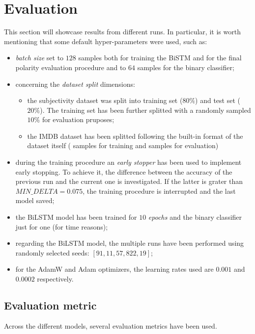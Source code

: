 
\section{Evaluation}
\label{sec:eval}
This section will showcase results from different runs. In particular, it is worth mentioning that some default hyper-parameters were used, such as:
\begin{itemize}
    \item \textit{batch size} set to $128$ samples both for training the BiSTM and for the final polarity evaluation procedure and to $64$ 
        samples for the  binary classifier;
    \item concerning the \textit{dataset split} dimensions:
        \begin{itemize}
            \item the subjectivity dataset was split into training set ($80\%$) and test set ($20\%$). The training set has been further splitted 
            with a  randomly sampled $10\%$ for evaluation pruposes;
        \item the IMDB dataset has been splitted following the built-in format of the dataset itself ( samples for training
            and  samples for evaluation)
        \end{itemize}
    \item during the training procedure an \textit{early stopper} has been used to implement early stopping. To achieve it, the 
        difference between the accuracy of the previous run and the current one is investigated. If the latter is grater than $MIN\_DELTA=0.075$, 
        the training procedure is interrupted and the last model saved;
    \item the BiLSTM model has been trained for $10$ \textit{epochs} and the binary classifier just for one (for time reasons);
    \item regarding the BiLSTM model, the multiple runs have been performed using  randomly selected seeds: $[91, 11, 57, 822, 19]$;
    \item for the AdamW and Adam optimizers, the learning rates used are $0.001$ and $0.0002$ respectively. 
\end{itemize}


\subsection{Evaluation metric}
\label{subsec:metric}
Across the different models, several evaluation metrics have been used. 
\vspace{-1.0em}
